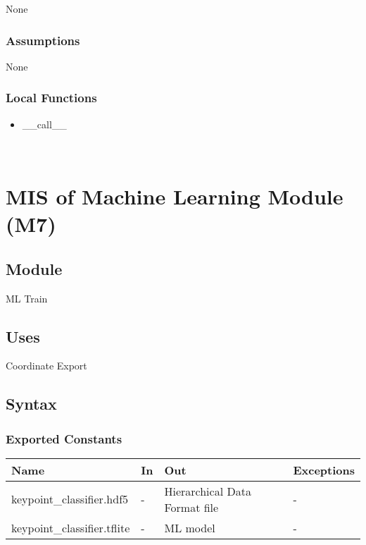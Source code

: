 \documentclass[12pt, titlepage]{article}
\begin{document}
None\\

\subsubsection{Assumptions}

None\\

\subsubsection{Local Functions}
\begin{itemize}
\item \_\_call\_\_
\end{itemize}

~\newpage

\section{MIS of Machine Learning Module (M7)} \label{M7}

\subsection{Module}

ML Train\\

\subsection{Uses}

Coordinate Export\\

\subsection{Syntax}

\subsubsection{Exported Constants}

\begin{center}
\begin{tabular}{p{5cm} p{3cm} p{3cm} p{4cm}}
\hline
\textbf{Name} & \textbf{In} & \textbf{Out} & \textbf{Exceptions} \\
\hline
keypoint\_classifier.hdf5 & - & Hierarchical Data Format file & - \\
keypoint\_classifier.tflite & - & ML model & - \\
\hline
\end{tabular}
\end{center}
\end{document}

